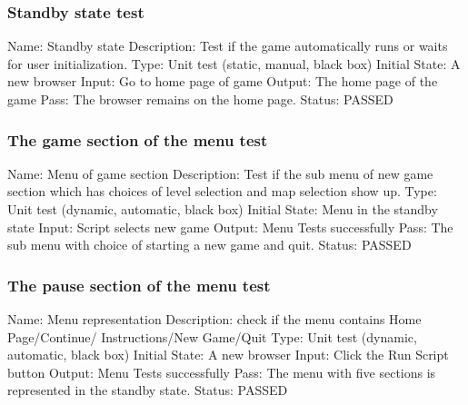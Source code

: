 \documentclass{article}
\begin{document}
\subsubsection{Standby state test}
\label{sec:3.1.2}
Name:  Standby state\newline
Description: Test if the game automatically runs or waits
for user initialization. \newline
Type: Unit test (static, manual, black box) \newline
Initial State: A new browser \newline
Input: Go to home page of game \newline
Output: The home page of the game \newline
Pass: The browser remains on the home page. \newline
\newline Status: PASSED

\subsubsection{The game section of the menu test}
\label{sec:3.1.3}
Name: Menu of game section\newline
Description: Test if the sub menu of new game section which has choices of 
level selection and map selection show up.
\newline
Type: Unit test (dynamic, automatic, black box) \newline
Initial State: Menu in the standby state \newline
Input: Script selects new game \newline
Output:  Menu Tests successfully  \newline
Pass: The sub menu with choice of starting a new game and quit. \newline
\newline Status: PASSED

\subsubsection{The pause section of the menu test}
\label{sec:3.1.4}
Name:  Menu representation\newline
Description: check if the menu contains Home Page/Continue/
Instructions/New Game/Quit \newline
Type: Unit test (dynamic, automatic, black box) \newline
Initial State: A new browser \newline
Input: Click the Run Script button \newline
Output: Menu Tests successfully \newline
Pass: The menu with five sections is represented in the standby state. \newline
\newline Status: PASSED
\end{document}
